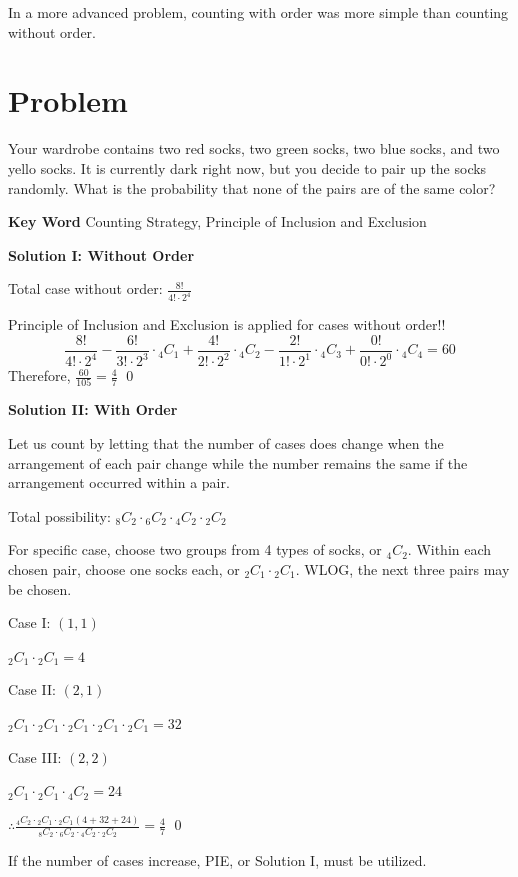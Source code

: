 \documentclass{article}
\begin{document}
In a more advanced problem, counting with order was more
simple than counting without order.

\newpage
\section*{Problem}
Your wardrobe contains two red socks, two green socks,
two blue socks, and two yello socks. It is currently dark
right now, but you decide to pair up the socks randomly.
What is the probability that none of the pairs are of the
same color?

\textbf{Key Word} Counting Strategy,
Principle of Inclusion and Exclusion

\textbf{Solution I: Without Order}

Total case without order: $\frac{8!}{4!\cdot2^4}$

Principle of Inclusion and Exclusion is applied for
cases without order!!
\[
\frac{8!}{4! \cdot 2^4} - \frac{6!}{3! \cdot 2^3}
\cdot {}_4C_1 + \frac{4!}{2!\cdot2^2} \cdot {}_4C_2
- \frac{2!}{1! \cdot 2^1} \cdot {}_4C_3 +
\frac{0!}{0! \cdot 2^0} \cdot {}_4C_4 = 60
\]
Therefore, $\frac{60}{105} = \boxed{\frac{4}{7}}$
\qed


\textbf{Solution II: With Order}

Let us count by letting that the number of cases does
change when the arrangement of each pair change while
the number remains the same if the arrangement occurred
within a pair.

Total possibility:
${}_8C_2 \cdot {}_6C_2 \cdot {}_4C_2 \cdot {}_2C_2$

For specific case, choose two groups from 4 types of
socks, or ${}_4C_2$. Within each chosen pair, choose
one socks each, or ${}_2C_1 \cdot {}_2C_1$. WLOG, the
next three pairs may be chosen.

Case I: $(1, 1)$

${}_2C_1 \cdot {}_2C_1 = 4$


Case II: $(2,1)$

${}_2C_1 \cdot {}_2C_1 \cdot {}_2C_1
\cdot {}_2C_1 \cdot {}_2C_1 = 32$


Case III: $(2,2)$

${}_2C_1 \cdot {}_2C_1 \cdot {}_4C_2 = 24$


$\therefore \frac{ {}_4C_2 \cdot {}_2C_1 \cdot
{}_2C_1 (4 + 32 + 24) }{ {}_8C_2 \cdot {}_6C_2 
\cdot {}_4C_2 \cdot {}_2C_2 } = \boxed{\frac{4}{7}}$
\qed


If the number of cases increase, PIE, or Solution I,
must be utilized.
\end{document}
